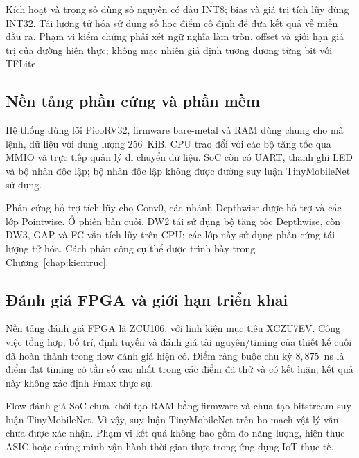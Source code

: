 Kích hoạt và trọng số dùng số nguyên có dấu INT8; bias và giá trị tích lũy dùng INT32. Tái lượng tử hóa sử dụng số học điểm cố định để đưa kết quả về miền đầu ra. Phạm vi kiểm chứng phải xét ngữ nghĩa làm tròn, offset và giới hạn giá trị của đường hiện thực; không mặc nhiên giả định tương đương từng bit với TFLite.

\subsection{Nền tảng phần cứng và phần mềm}
Hệ thống dùng lõi PicoRV32, firmware bare-metal và RAM dùng chung cho mã lệnh, dữ liệu với dung lượng 256~KiB. CPU trao đổi với các bộ tăng tốc qua MMIO và trực tiếp quản lý di chuyển dữ liệu. SoC còn có UART, thanh ghi LED và bộ nhân độc lập; bộ nhân độc lập không được đường suy luận TinyMobileNet sử dụng.

Phần cứng hỗ trợ tích lũy cho Conv0, các nhánh Depthwise được hỗ trợ và các lớp Pointwise. Ở phiên bản cuối, DW2 tái sử dụng bộ tăng tốc Depthwise, còn DW3, GAP và FC vẫn tích lũy trên CPU; các lớp này sử dụng phần cứng tái lượng tử hóa. Cách phân công cụ thể được trình bày trong Chương~\ref{chap:kientruc}.

\subsection{Đánh giá FPGA và giới hạn triển khai}
Nền tảng đánh giá FPGA là ZCU106, với linh kiện mục tiêu XCZU7EV. Công việc tổng hợp, bố trí, định tuyến và đánh giá tài nguyên/timing của thiết kế cuối đã hoàn thành trong flow đánh giá hiện có. Điểm ràng buộc chu kỳ $8{,}875$~ns là điểm đạt timing có tần số cao nhất trong các điểm đã thử và có kết luận; kết quả này không xác định Fmax thực sự.

Flow đánh giá SoC chưa khởi tạo RAM bằng firmware và chưa tạo bitstream suy luận TinyMobileNet. Vì vậy, suy luận TinyMobileNet trên bo mạch vật lý vẫn chưa được xác nhận. Phạm vi kết quả không bao gồm đo năng lượng, hiện thực ASIC hoặc chứng minh vận hành thời gian thực trong ứng dụng IoT thực tế.

